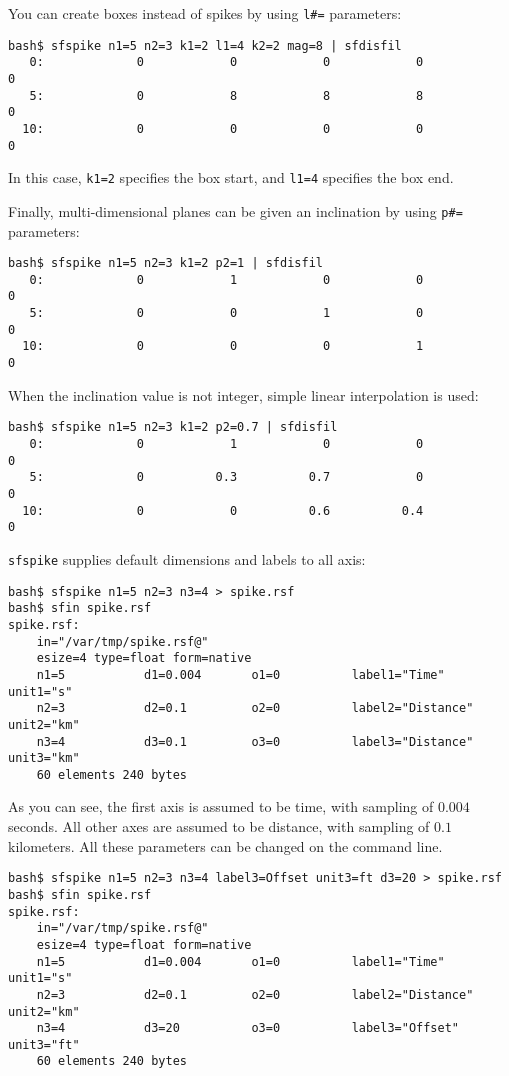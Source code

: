 You can create boxes instead of spikes by using \texttt{l\#=}
parameters:
\begin{verbatim}
bash$ sfspike n1=5 n2=3 k1=2 l1=4 k2=2 mag=8 | sfdisfil
   0:             0            0            0            0            0
   5:             0            8            8            8            0
  10:             0            0            0            0            0
\end{verbatim}
In this case, \texttt{k1=2} specifies the box start, and \texttt{l1=4}
specifies the box end.

Finally, multi-dimensional planes can be given an inclination by using \texttt{p\#=} parameters:
\begin{verbatim}
bash$ sfspike n1=5 n2=3 k1=2 p2=1 | sfdisfil
   0:             0            1            0            0            0
   5:             0            0            1            0            0
  10:             0            0            0            1            0
\end{verbatim}
When the inclination value is not integer, simple linear interpolation is used:
\begin{verbatim}
bash$ sfspike n1=5 n2=3 k1=2 p2=0.7 | sfdisfil
   0:             0            1            0            0            0
   5:             0          0.3          0.7            0            0
  10:             0            0          0.6          0.4            0
\end{verbatim}

\texttt{sfspike} supplies default dimensions and labels to all axis:
\begin{verbatim}
bash$ sfspike n1=5 n2=3 n3=4 > spike.rsf
bash$ sfin spike.rsf
spike.rsf:
    in="/var/tmp/spike.rsf@"
    esize=4 type=float form=native 
    n1=5           d1=0.004       o1=0          label1="Time" unit1="s" 
    n2=3           d2=0.1         o2=0          label2="Distance" unit2="km" 
    n3=4           d3=0.1         o3=0          label3="Distance" unit3="km" 
	60 elements 240 bytes
\end{verbatim}
As you can see, the first axis is assumed to be time, with sampling of
$0.004$ seconds. All other axes are assumed to be distance, with
sampling of $0.1$ kilometers. All these parameters can be changed on
the command line.
\begin{verbatim}
bash$ sfspike n1=5 n2=3 n3=4 label3=Offset unit3=ft d3=20 > spike.rsf
bash$ sfin spike.rsf
spike.rsf:
    in="/var/tmp/spike.rsf@"
    esize=4 type=float form=native 
    n1=5           d1=0.004       o1=0          label1="Time" unit1="s" 
    n2=3           d2=0.1         o2=0          label2="Distance" unit2="km" 
    n3=4           d3=20          o3=0          label3="Offset" unit3="ft" 
	60 elements 240 bytes
\end{verbatim}

